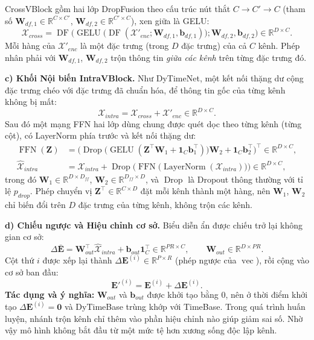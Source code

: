 \documentclass[12pt,a4paper]{report}
\numberwithin{equation}{chapter}
\newcommand{\R}{\mathbb{R}}
\newcommand{\one}{\mathbf{1}}
\newcommand{\LN}{\operatorname{LayerNorm}}
\newcommand{\GELU}{\operatorname{GELU}}
\newcommand{\DF}{\operatorname{DF}}
\newcommand{\FFN}{\operatorname{FFN}}
\newcommand{\vecr}{\operatorname{vec}}
\begin{document}
CrossVBlock gồm hai lớp DropFusion theo cấu trúc nút thắt $C\to C'\to C$ (tham số
$\mathbf{W}_{df,1}\in\R^{C\times C'}$, $\mathbf{W}_{df,2}\in\R^{C'\times C}$), xen giữa là GELU:
\begin{equation}
\mathcal{X}_{cross} = \DF\Big(\GELU\big(\DF(\mathcal{X}'_{enc};\mathbf{W}_{df,1},\mathbf{b}_{df,1})\big);
\mathbf{W}_{df,2},\mathbf{b}_{df,2}\Big)\in\R^{D\times C}.
\label{eq:cross}
\end{equation}
Mỗi hàng của $\mathcal{X}'_{enc}$ là một đặc trưng (trong $D$ đặc trưng) của cả $C$ kênh. Phép nhân phải với
$\mathbf{W}_{df,1}$, $\mathbf{W}_{df,2}$ trộn thông tin \emph{giữa các kênh} trên từng đặc trưng đó.

\textbf{c) Khối Nội biến IntraVBlock.} Như DyTimeNet, một kết nối thặng dư cộng đặc trưng chéo với đặc trưng đã chuẩn
hóa, để thông tin gốc của từng kênh không bị mất:
\begin{equation}
\mathcal{X}_{intra} = \mathcal{X}_{cross} + \mathcal{X}'_{enc}\in\R^{D\times C}.
\label{eq:cross-res}
\end{equation}
Sau đó một mạng FFN hai lớp dùng chung được quét dọc theo từng kênh (từng cột), có LayerNorm phía trước và kết nối
thặng dư:
\begin{align}
\FFN(\mathbf{Z}) &= \Big(\operatorname{Drop}\big(\GELU(\mathbf{Z}^{\top}\mathbf{W}_1+\one_C\mathbf{b}_1^{\top})\big)\mathbf{W}_2
+ \one_C\mathbf{b}_2^{\top}\Big)^{\!\top}\in\R^{D\times C},
\label{eq:ffn}\\
\hat{\mathcal{X}}_{intra} &= \mathcal{X}_{intra} + \operatorname{Drop}\Big(\FFN\big(\LN(\mathcal{X}_{intra})\big)\Big)
\in\R^{D\times C},
\label{eq:intra}
\end{align}
trong đó $\mathbf{W}_1\in\R^{D\times D_{ff}}$, $\mathbf{W}_2\in\R^{D_{ff}\times D}$, và $\operatorname{Drop}$ là
Dropout thông thường với tỉ lệ $p_{drop}$. Phép chuyển vị $\mathbf{Z}^{\top}\in\R^{C\times D}$ đặt mỗi kênh thành một
hàng, nên $\mathbf{W}_1$, $\mathbf{W}_2$ chỉ biến đổi trên $D$ đặc trưng của từng kênh, không trộn các kênh.

\textbf{d) Chiếu ngược và Hiệu chỉnh cơ sở.} Biểu diễn ẩn được chiếu trở lại không gian cơ sở:
\begin{equation}
\Delta\bar{\mathbf{E}} = \mathbf{W}_{out}^{\top}\hat{\mathcal{X}}_{intra} + \mathbf{b}_{out}\one_C^{\top}\in\R^{PR\times C},
\qquad \mathbf{W}_{out}\in\R^{D\times PR}.
\label{eq:proj}
\end{equation}
Cột thứ $i$ được xếp lại thành $\Delta\mathbf{E}^{(i)}\in\R^{P\times R}$ (phép ngược của $\vecr$), rồi cộng vào cơ sở
ban đầu:
\begin{equation}
\mathbf{E}'^{(i)} = \mathbf{E}^{(i)} + \Delta\mathbf{E}^{(i)}.
\label{eq:basis-update}
\end{equation}
\textbf{Tác dụng và ý nghĩa:} $\mathbf{W}_{out}$ và $\mathbf{b}_{out}$ được khởi tạo bằng 0, nên ở thời điểm khởi tạo
$\Delta\mathbf{E}^{(i)}=\mathbf{0}$ và DyTimeBase trùng khớp với TimeBase. Trong quá trình huấn luyện, nhánh trộn kênh
chỉ thêm vào phần hiệu chỉnh nào giúp giảm sai số. Nhờ vậy mô hình không bắt đầu từ một mức tệ hơn xương sống độc
lập kênh.
\end{document}

